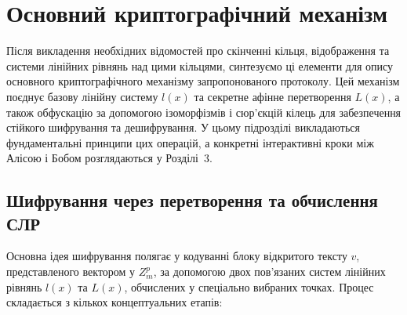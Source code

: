 \section{Основний криптографічний механізм}
\label{sec:core_mechanism}
Після викладення необхідних відомостей про скінченні кільця, відображення та системи лінійних рівнянь над цими кільцями, синтезуємо ці елементи для опису основного криптографічного механізму запропонованого протоколу.
Цей механізм поєднує базову лінійну систему $l(x)$ та секретне афінне перетворення $L(x)$, а також обфускацію за допомогою ізоморфізмів і сюр'єкцій кілець для забезпечення стійкого шифрування та дешифрування.
У цьому підрозділі викладаються фундаментальні принципи цих операцій, а конкретні інтерактивні кроки між Алісою і Бобом розглядаються у Розділі~3.

\subsection{Шифрування через перетворення та обчислення СЛР}
\label{subsec:encryption_mechanism}
Основна ідея шифрування полягає у кодуванні блоку відкритого тексту $v$, представленого вектором у $Z_m^p$, за допомогою двох пов'язаних систем лінійних рівнянь $l(x)$ та $L(x)$, обчислених у спеціально вибраних точках.
Процес складається з кількох концептуальних етапів:


